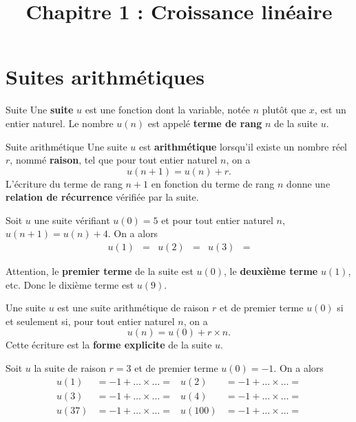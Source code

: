 \documentclass[11pt]{article}
\title{Chapitre 1 : Croissance linéaire}
\date{}
\author{}
\begin{document}
\maketitle\thispagestyle{fancy}

\section{Suites arithmétiques}
\begin{defi}{Suite}
  Une \textbf{suite} $u$ est une fonction dont la variable, notée $n$ plutôt que
  $x$, est un entier naturel. Le nombre $u(n)$ est appelé \textbf{terme de
  rang} $n$ de la suite $u$.
\end{defi}

\begin{defi}{Suite arithmétique}
  Une suite $u$ est \textbf{arithmétique} lorsqu'il existe un nombre réel $r$,
  nommé \textbf{raison}, tel que pour tout entier naturel $n$, on a
  \[
    u(n+1) = u(n) + r.
  \]
  L'écriture du terme de rang $n+1$ en fonction du terme de rang $n$ donne une
  \textbf{relation de récurrence} vérifiée par la suite.
\end{defi}

\begin{exemple}
  Soit $u$ une suite vérifiant $u(0)=5$ et pour tout entier naturel $n$,
  $u(n+1)=u(n)+4$.
  On a alors
  \begin{align*}
    u(1) &= &
    u(2) &= &
    u(3) &=
  \end{align*}
\end{exemple}

\begin{rmq}
  Attention, le \textbf{premier terme} de la suite est $u(0)$, le
  \textbf{deuxième terme} $u(1)$, etc. Donc le dixième terme est $u(9)$.
\end{rmq}

\begin{prop}
  Une suite $u$ est une suite arithmétique de raison $r$ et de premier terme
  $u(0)$ si et seulement si, pour tout entier naturel $n$, on a
  \[
    u(n) = u(0) + r\times n.
  \]
  Cette écriture est la \textbf{forme explicite} de la suite $u$.
\end{prop}

\begin{exemple}
  Soit $u$ la suite de raison $r=3$ et de premier terme $u(0)=-1$. On a alors
  \begin{align*}
    u(1) &= -1 + \ldots\times\ldots = & 
    u(2) &= -1 + \ldots\times\ldots = \\ 
    u(3) &= -1 + \ldots\times\ldots = & 
    u(4) &= -1 + \ldots\times\ldots = \\
    u(37) &= -1 + \ldots\times\ldots = & 
    u(100) &= -1 + \ldots\times\ldots =
  \end{align*}
\end{exemple}
\end{document}

